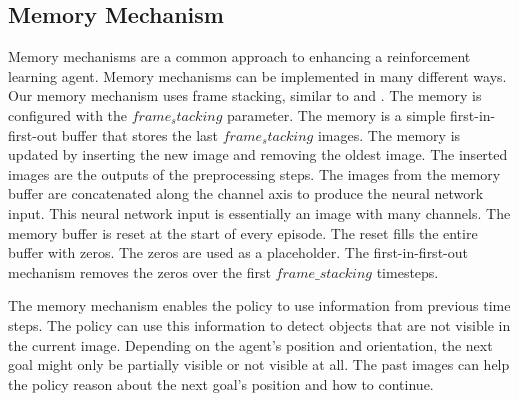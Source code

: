 \subsection{Memory Mechanism}

Memory mechanisms are a common approach to enhancing a reinforcement learning agent. Memory mechanisms can be implemented in many different ways. Our memory mechanism uses frame stacking, similar to \autocite{maximilian} and \autocite{atari}. The memory is configured with the $frame_stacking$ parameter. The memory is a simple first-in-first-out buffer that stores the last $frame_stacking$ images. The memory is updated by inserting the new image and removing the oldest image. The inserted images are the outputs of the preprocessing steps.
The images from the memory buffer are concatenated along the channel axis to produce the neural network input. This neural network input is essentially an image with many channels.
The memory buffer is reset at the start of every episode. The reset fills the entire buffer with zeros. The zeros are used as a placeholder. The first-in-first-out mechanism removes the zeros over the first $frame\_stacking$ timesteps.

The memory mechanism enables the policy to use information from previous time steps. The policy can use this information to detect objects that are not visible in the current image. Depending on the agent's position and orientation, the next goal might only be partially visible or not visible at all. The past images can help the policy reason about the next goal's position and how to continue.



\newcommand{\includePreprocessedImage}[1]{\texttt{[image: Bilder/image\_printer\_images/memory\_mechanism/preprocessed\_image\_step\_\#1.png]}}
\newcommand\timestepT{5}
\newcommand\timestepTminusOne{4}
\newcommand\timestepTminusTwo{3}
\newcommand\timestepTminusThree{2}
\newcommand\timestepTminusFour{1}
\newcommand\imagesOffsetY{0}
\newcommand\inOutImageHeight{0.75}
\newcommand\bufferXOffset{-2}
\newcommand\bufferWidth{7}


\usetikzlibrary{fit}

